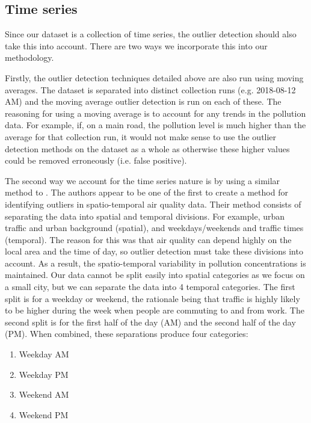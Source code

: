 \documentclass[11pt]{report}
\begin{document}
\subsection{Time series}

Since our dataset is a collection of time series, the outlier detection should also take this into account. There are two ways we incorporate this into our methodology.

Firstly, the outlier detection techniques detailed above are also run using moving averages. The dataset is separated into distinct collection runs (e.g. 2018-08-12 AM) and the moving average outlier detection is run on each of these. The reasoning for using a moving average is to account for any trends in the pollution data. For example, if, on a main road, the pollution level is much higher than the average for that collection run, it would not make sense to use the outlier detection methods on the dataset as a whole as otherwise these higher values could be removed erroneously (i.e. false positive).

The second way we account for the time series nature is by using a similar method to \cite{vanZoest2018outlierdetection}. The authors appear to be one of the first to create a method for identifying outliers in spatio-temporal air quality data. Their method consists of separating the data into spatial and temporal divisions. For example, urban traffic and urban background (spatial), and weekdays/weekends and traffic times (temporal). The reason for this was that air quality can depend highly on the local area and the time of day, so outlier detection must take these divisions into account. As a result, the spatio-temporal variability in pollution concentrations is maintained. Our data cannot be split easily into spatial categories as we focus on a small city, but we can separate the data into 4 temporal categories. The first split is for a weekday or weekend, the rationale being that traffic is highly likely to be higher during the week when people are commuting to and from work. The second split is for the first half of the day (AM) and the second half of the day (PM). When combined, these separations produce four categories:
\begin{enumerate}
\item Weekday AM
\item Weekday PM
\item Weekend AM
\item Weekend PM
\end{enumerate}
\end{document}
